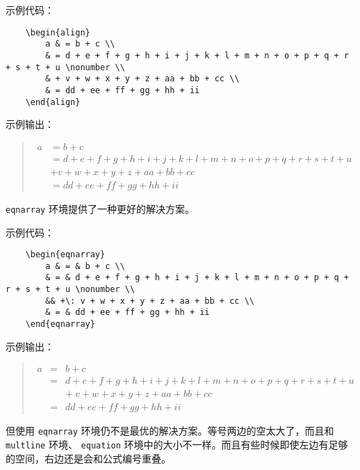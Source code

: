 \documentclass[UTF8]{ctexart}
\begin{document}
示例代码：
\begin{verbatim}
    \begin{align}
        a & = b + c \\
        & = d + e + f + g + h + i + j + k + l + m + n + o + p + q + r + s + t + u \nonumber \\
        & + v + w + x + y + z + aa + bb + cc \\
        & = dd + ee + ff + gg + hh + ii
    \end{align}
\end{verbatim}

示例输出：
\begin{quote}
    \begin{align}
        a & = b + c \\
        & = d + e + f + g + h + i + j + k + l + m + n + o + p + q + r + s + t + u \nonumber \\
        & + v + w + x + y + z + aa + bb + cc \\
        & = dd + ee + ff + gg + hh + ii
    \end{align}
\end{quote}

\texttt{eqnarray} 环境提供了一种更好的解决方案。

示例代码：
\begin{verbatim}
    \begin{eqnarray}
        a & = & b + c \\
        & = & d + e + f + g + h + i + j + k + l + m + n + o + p + q + r + s + t + u \nonumber \\
        && +\: v + w + x + y + z + aa + bb + cc \\
        & = & dd + ee + ff + gg + hh + ii
    \end{eqnarray}
\end{verbatim}

示例输出：
\begin{quote}
    \begin{eqnarray}
        a & = & b + c \\
        & = & d + e + f + g + h + i + j + k + l + m + n + o + p + q + r + s + t + u \nonumber \\
        && +\: v + w + x + y + z + aa + bb + cc \\
        & = & dd + ee + ff + gg + hh + ii
    \end{eqnarray}
\end{quote}

但使用 \texttt{eqnarray} 环境仍不是最优的解决方案。等号两边的空太大了，而且和 \texttt{multline} 环境、
\texttt{equation} 环境中的大小不一样。而且有些时候即使左边有足够的空间，右边还是会和公式编号重叠。
\end{document}
